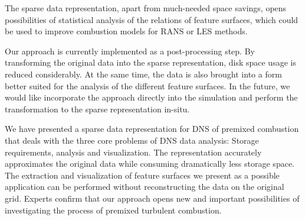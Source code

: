 The sparse data representation, apart from much-needed space savings, opens
possibilities of statistical analysis of the relations of feature surfaces,
which could be used to improve combustion models for \ac{RANS} or \ac{LES}
methods.

Our approach is currently implemented as a post-processing step. By transforming
the original data into the sparse representation, disk space usage is
reduced considerably. At the same time, the data is also brought into a form
better suited for the analysis of the different feature surfaces. In the future,
we would like incorporate the approach directly into the simulation and perform
the transformation to the sparse representation in-situ.

We have presented a sparse data representation for \ac{DNS} of premixed combustion
that deals with the three core problems of \ac{DNS} data analysis: Storage
requirements, analysis and visualization. The representation accurately
approximates the original data while consuming dramatically less storage space.
The extraction and visualization of feature surfaces we present as a possible
application can be performed without reconstructing the data on the original
grid. Experts confirm that our approach opens new and important possibilities
of investigating the process of premixed turbulent combustion.

%
